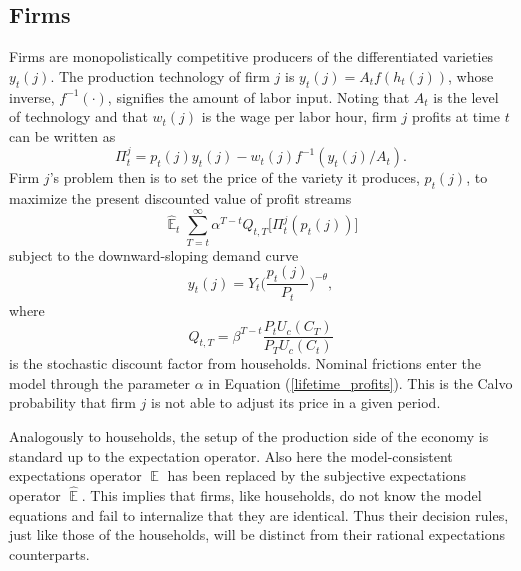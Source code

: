 \documentclass[11pt]{article}
\renewcommand{\[}{\begin{equation}}
\renewcommand{\]}{\end{equation}}
\DeclareMathOperator{\E}{\mathbb{E}}
\begin{document}
\subsection{Firms}

Firms are monopolistically competitive producers of the differentiated varieties $y_t(j)$. The production technology of firm $j$ is $y_t(j)=A_tf(h_t(j))$, whose inverse, $f^{-1}(\cdot)$, signifies the amount of labor input. Noting that $A_t$ is the level of technology and that $w_t(j)$ is the wage per labor hour, firm $j$ profits at time $t$ can be written as
\begin{equation}
\Pi_t^j = p_t(j)y_t(j) -w_t(j)f^{-1}(y_t(j)/A_t).
\end{equation}
Firm $j$'s problem then is to set the price of the variety it produces, $p_t(j)$, to maximize the present discounted value of profit streams
\begin{equation}
\hat{\E}_t\sum^{\infty}_{T=t}\alpha^{T-t} Q_{t,T} \bigg[ \Pi^j_t(p_t(j))\bigg]
\label{lifetime_profits}
\end{equation}
subject to the downward-sloping demand curve
\begin{equation}
y_t(j) = Y_t \bigg(\frac{p_t(j)}{P_t}\bigg)^{-\theta},
\end{equation}
where 
\begin{equation}
Q_{t,T} = \beta^{T-t} \frac{P_t U_c(C_T)}{P_T U_c(C_t)}
\end{equation}
is the stochastic discount factor from households. Nominal frictions enter the model through the parameter $\alpha$ in Equation (\ref{lifetime_profits}). This is the Calvo probability that firm $j$ is not able to adjust its price in a given period. 

Analogously to households, the setup of the production side of the economy is standard up to the expectation operator. Also here the model-consistent expectations operator $\E$ has been replaced by the subjective expectations operator $\hat{\E}$. This implies that firms, like households, do not know the model equations and fail to internalize that they are identical. Thus their decision rules, just like those of the households, will be distinct from their rational expectations counterparts. 
\end{document}
